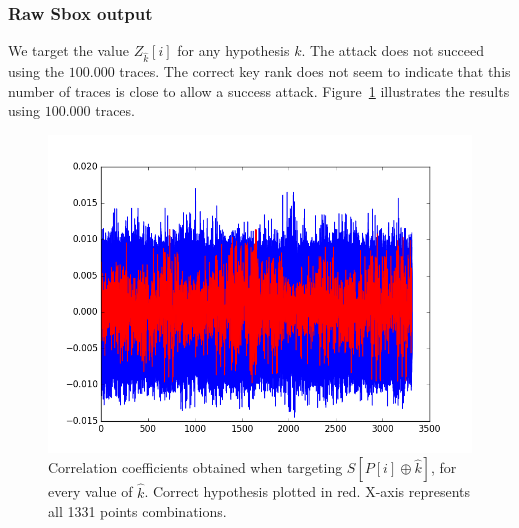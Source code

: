 \subsubsection{Raw Sbox output}
We target the value $Z_{\hat{k}}[i]$ for any hypothesis $k$.
The attack does not succeed using the $100.000$ traces. The correct key rank does not seem to indicate that this number of traces is close to allow a success attack.
Figure~\ref{fig:CPA3O_averagedZ1} illustrates the results using $100.000$ traces.

\begin{figure}[H]
	\centering 
	\includegraphics[scale=0.35]{figures/CPA3O_averagedZ1.png}
	\caption{Correlation coefficients obtained when targeting $S[P[i]\oplus \hat{k}] $, for every value of $\hat{k}$. Correct hypothesis plotted in red. X-axis represents all 1331 points combinations.}
	\label{fig:CPA3O_averagedZ1}
\end{figure}


